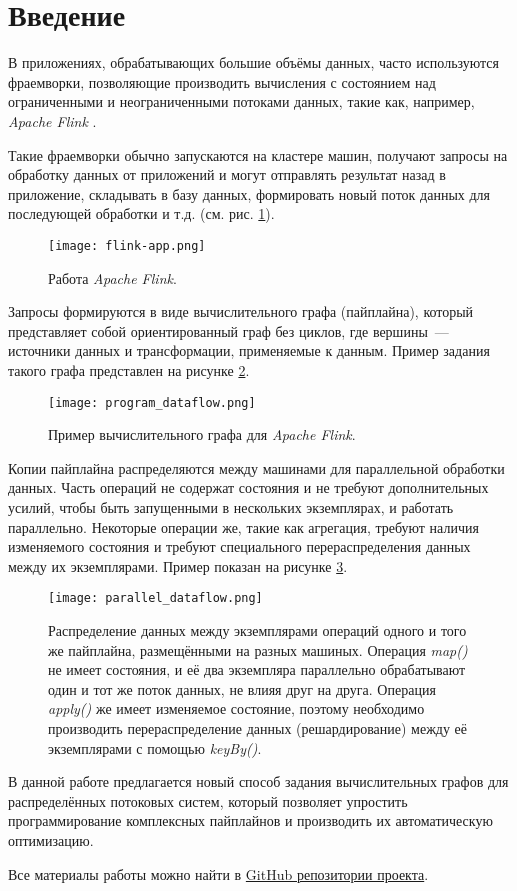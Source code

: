 \section{Введение}

В приложениях, обрабатывающих большие объёмы данных, часто используются фраемворки, позволяющие производить вычисления с состоянием над ограниченными и неограниченными потоками данных, такие как, например, \textit{Apache Flink} \cite{flink-org}.

Такие фраемворки обычно запускаются на кластере машин, получают запросы на обработку данных от приложений и могут отправлять результат назад в приложение, складывать в базу данных, формировать новый поток данных для последующей обработки и т.д. (см. рис. \ref{fig:flink-app}).

\begin{figure}[h]
    \texttt{[image: flink-app.png]}
    \caption{Работа \textit{Apache Flink}.}
    \label{fig:flink-app}
\end{figure}

Запросы формируются в виде вычислительного графа (пайплайна), который представляет собой ориентированный граф без циклов, где вершины~--- источники данных и трансформации, применяемые к данным. Пример задания такого графа представлен на рисунке \ref{fig:prog-data}.

\begin{figure}
    \texttt{[image: program\_dataflow.png]}
    \caption{Пример вычислительного графа для \textit{Apache Flink}.}
    \label{fig:prog-data}
\end{figure}

Копии пайплайна распределяются между машинами для параллельной обработки данных.
Часть операций не содержат состояния и не требуют дополнительных усилий, чтобы быть запущенными в нескольких экземплярах, и работать параллельно.
Некоторые операции же, такие как агрегация, требуют наличия изменяемого состояния и требуют специального перераспределения данных между их экземплярами. Пример показан на рисунке \ref{fig:par-data}.

\begin{figure}
    \texttt{[image: parallel\_dataflow.png]}
    \caption{Распределение данных между экземплярами операций одного и того же пайплайна, размещёнными на разных машиных. Операция \textit{map()} не имеет состояния, и её два экземпляра параллельно обрабатывают один и тот же поток данных, не влияя друг на друга. Операция \textit{apply()} же имеет изменяемое состояние, поэтому необходимо производить перераспределение данных (решардирование) между её экземплярами с помощью \textit{keyBy()}.}
    \label{fig:par-data}
\end{figure}

В данной работе предлагается новый способ задания вычислительных графов для распределённых потоковых систем, который позволяет упростить программирование комплексных пайплайнов и производить их автоматическую оптимизацию.

Все материалы работы можно найти в \href{https://github.com/winter-yuki/calco}{GitHub репозитории проекта}.
